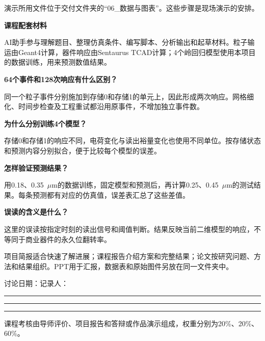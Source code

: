 \documentclass[UTF8,fontset=fandol,11pt,a4paper]{ctexart}
\newcommand{\titleline}[1]{{\small\bfseries\color{blue}课程配套材料}\par\vspace{6pt}{\LARGE\bfseries #1}\par\vspace{8pt}}
\newcommand{\parttitle}[1]{\par\vspace{10pt}{\large\bfseries #1}\par\vspace{3pt}}
\newcommand{\smallnote}[1]{\par{\small\color{muted}#1}\par}
\begin{document}
\vfill
\smallnote{演示所用文件位于交付文件夹的“06\_数据与图表”。这些步骤是现场演示的安排。}

\newpage
\titleline{汇报说明与讨论记录}
\parttitle{AI工具的用途}
AI助手参与理解题目、整理仿真条件、编写脚本、分析输出和起草材料。粒子输运由Geant4计算，器件响应由Sentaurus TCAD计算；4个岭回归模型使用本项目的数据训练，用来预测数值结果。

\parttitle{常见问题}
\textbf{64个事件和128次响应有什么区别？}\par
同一个粒子事件分别施加到存储0和存储1的单元上，因此形成两次响应。网格细化、时间步检查及工程重试都沿用原事件，不增加独立事件数。

\textbf{为什么分别训练4个模型？}\par
存储0和存储1的响应不同，电荷变化与读出裕量变化也使用不同单位。按存储状态和预测内容分别拟合，便于比较每个模型的误差。

\textbf{怎样验证预测结果？}\par
用0.18、0.35~$\mu$m的数据训练，固定模型和预测后，再计算0.25、0.45~$\mu$m的测试结果。每条预测都有对应的仿真值，误差表汇总了这些差值。

\textbf{误读的含义是什么？}\par
这里的误读按指定时刻的读出信号和阈值判断。结果反映当前二维模型的响应，不等同于商业器件的永久位翻转率。

\parttitle{查阅材料}
项目简报适合快速了解进展；课程报告介绍方案和完整结果；论文按研究问题、方法和结果组织。PPT用于汇报，数据表和原始图件另放在同一文件夹中。

\parttitle{教师意见与修改记录}
\smallnote{讨论日期：\underline{\hspace{3.5cm}}\hfill 记录人：\underline{\hspace{3.5cm}}}
\vspace{14pt}\hrule\vspace{24pt}\hrule\vspace{24pt}\hrule
\vfill
\smallnote{课程考核由导师评价、项目报告和答辩或作品演示组成，权重分别为20\%、20\%、60\%。}
\end{document}

